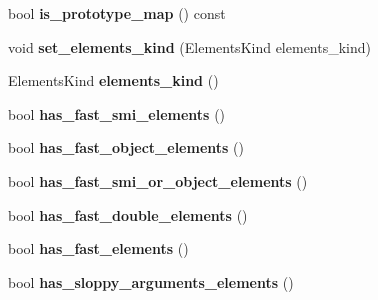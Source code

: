 \begin{DoxyCompactItemize}
\item 
bool {\bfseries is\+\_\+prototype\+\_\+map} () const \hypertarget{classv8_1_1internal_1_1_map_a68b59a43fcad4bf058109e1c0ca58e8f}{}\label{classv8_1_1internal_1_1_map_a68b59a43fcad4bf058109e1c0ca58e8f}

\item 
void {\bfseries set\+\_\+elements\+\_\+kind} (Elements\+Kind elements\+\_\+kind)\hypertarget{classv8_1_1internal_1_1_map_a9632fe844e996ace79d586ba76d95911}{}\label{classv8_1_1internal_1_1_map_a9632fe844e996ace79d586ba76d95911}

\item 
Elements\+Kind {\bfseries elements\+\_\+kind} ()\hypertarget{classv8_1_1internal_1_1_map_a051598779de355f1b9f1aea0210b74ef}{}\label{classv8_1_1internal_1_1_map_a051598779de355f1b9f1aea0210b74ef}

\item 
bool {\bfseries has\+\_\+fast\+\_\+smi\+\_\+elements} ()\hypertarget{classv8_1_1internal_1_1_map_ac761a656b1ef453177f3f393e2f43f44}{}\label{classv8_1_1internal_1_1_map_ac761a656b1ef453177f3f393e2f43f44}

\item 
bool {\bfseries has\+\_\+fast\+\_\+object\+\_\+elements} ()\hypertarget{classv8_1_1internal_1_1_map_ac93ff4771fb7c04c91dcbb2349e6256e}{}\label{classv8_1_1internal_1_1_map_ac93ff4771fb7c04c91dcbb2349e6256e}

\item 
bool {\bfseries has\+\_\+fast\+\_\+smi\+\_\+or\+\_\+object\+\_\+elements} ()\hypertarget{classv8_1_1internal_1_1_map_a38482d438f917f30fd695bae568fc5ed}{}\label{classv8_1_1internal_1_1_map_a38482d438f917f30fd695bae568fc5ed}

\item 
bool {\bfseries has\+\_\+fast\+\_\+double\+\_\+elements} ()\hypertarget{classv8_1_1internal_1_1_map_ab62c42ca3179a9a3e8a0a8610e29388f}{}\label{classv8_1_1internal_1_1_map_ab62c42ca3179a9a3e8a0a8610e29388f}

\item 
bool {\bfseries has\+\_\+fast\+\_\+elements} ()\hypertarget{classv8_1_1internal_1_1_map_a41e77f7ac129e40fa144c8db4c0851f0}{}\label{classv8_1_1internal_1_1_map_a41e77f7ac129e40fa144c8db4c0851f0}

\item 
bool {\bfseries has\+\_\+sloppy\+\_\+arguments\+\_\+elements} ()\hypertarget{classv8_1_1internal_1_1_map_ac536a3ce7e056be835d883f54731d122}{}\label{classv8_1_1internal_1_1_map_ac536a3ce7e056be835d883f54731d122}


\end{DoxyCompactItemize}
